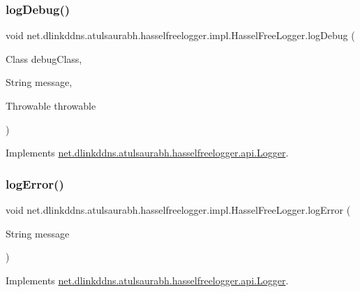 \subsubsection{\texorpdfstring{log\+Debug()}{logDebug()}\hspace{0.1cm}{\footnotesize\ttfamily [3/3]}}
{\footnotesize\ttfamily void net.\+dlinkddns.\+atulsaurabh.\+hasselfreelogger.\+impl.\+Hassel\+Free\+Logger.\+log\+Debug (\begin{DoxyParamCaption}\item[{Class}]{debug\+Class,  }\item[{String}]{message,  }\item[{Throwable}]{throwable }\end{DoxyParamCaption})}



Implements \mbox{\hyperlink{interfacenet_1_1dlinkddns_1_1atulsaurabh_1_1hasselfreelogger_1_1api_1_1_logger_aff388bb623493721b9aac70ef39492ec}{net.\+dlinkddns.\+atulsaurabh.\+hasselfreelogger.\+api.\+Logger}}.

\mbox{\label{classnet_1_1dlinkddns_1_1atulsaurabh_1_1hasselfreelogger_1_1impl_1_1_hassel_free_logger_a94641af9c6c39ea601d5c41bf68a4b1f}} 
\subsubsection{\texorpdfstring{log\+Error()}{logError()}\hspace{0.1cm}{\footnotesize\ttfamily [1/3]}}
{\footnotesize\ttfamily void net.\+dlinkddns.\+atulsaurabh.\+hasselfreelogger.\+impl.\+Hassel\+Free\+Logger.\+log\+Error (\begin{DoxyParamCaption}\item[{String}]{message }\end{DoxyParamCaption})}



Implements \mbox{\hyperlink{interfacenet_1_1dlinkddns_1_1atulsaurabh_1_1hasselfreelogger_1_1api_1_1_logger_ae6a2cef332dfb10951c4cbfd822bbb63}{net.\+dlinkddns.\+atulsaurabh.\+hasselfreelogger.\+api.\+Logger}}.

